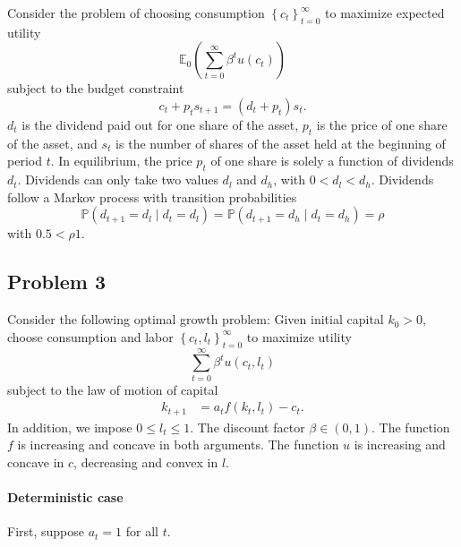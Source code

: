 \documentclass{article}
\begin{document}
Consider the problem of choosing consumption $\left\lbrace c_{t}\right\rbrace _{t=0}^{\infty}$ to maximize expected utility
\[

\mathbb{E}_{0}\left(\sum_{t=0}^{\infty}\beta^{t} u(c_{t})\right)

\]
subject to the budget constraint
\[

c_{t}+p_{t} s_{t+1}=(d_{t}+p_{t}) s_{t}.

\]
$d_{t}$ is the dividend paid out for one share of the asset, $p_{t}$ is the price of one share of the asset, and $s_{t}$ is the number of shares of the asset held at the beginning of period $t$. In equilibrium, the price $p_{t}$ of one share is solely a function of dividends $d_{t}$. Dividends can only take two values $d_{l}$ and $d_{h}$, with $0<d_{l}<d_{h}$. Dividends follow a Markov process with transition probabilities 
\[

\mathbb{P}\left(d_{t+1}=d_{l}\mid d_{t}=d_{l}\right) =\mathbb{P}\left(d_{t+1}=d_{h}\mid d_{t}=d_{h}\right) =\rho

\]
with $0.5<\rho 1$.


\subsection*{Problem 3}

Consider the following optimal growth problem: Given initial capital $k_{0}>0$, choose consumption and labor $\left\lbrace c_{t},l_{t}\right\rbrace _{t=0}^{\infty}$ to maximize utility
\[

\sum_{t=0}^{\infty}\beta^{t} u(c_{t},l_{t})

\]
subject to the law of motion of capital
\[
\begin{aligned}
k_{t+1}&=a_{t} f(k_{t},l_{t}) -c_{t}.
\end{aligned}
\]
In addition, we impose $0\le l_{t}\le 1$. The discount factor $\beta \in (0,1)$. The function $f$ is increasing and concave in both arguments. The function $u$ is increasing and concave in $c$, decreasing and convex in $l$. 

\paragraph{Deterministic case} First, suppose $a_{t}=1$ for all $t$.
\end{document}
